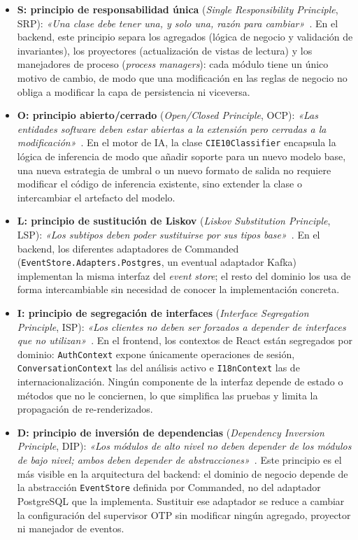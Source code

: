 \begin{itemize}
 \item \textbf{S: principio de responsabilidad única} (\emph{Single Responsibility Principle}, SRP): \emph{«Una clase debe tener una, y solo una, razón para cambiar»}~\cite{MartinPPP02}. En el backend, este principio separa los agregados (lógica de negocio y validación de invariantes), los proyectores (actualización de vistas de lectura) y los manejadores de proceso (\emph{process managers}): cada módulo tiene un único motivo de cambio, de modo que una modificación en las reglas de negocio no obliga a modificar la capa de persistencia ni viceversa.

 \item \textbf{O: principio abierto/cerrado} (\emph{Open/Closed Principle}, OCP): \emph{«Las entidades software deben estar abiertas a la extensión pero cerradas a la modificación»}~\cite{MartinPPP02}. En el motor de IA, la clase \texttt{CIE10Classifier} encapsula la lógica de inferencia de modo que añadir soporte para un nuevo modelo base, una nueva estrategia de umbral o un nuevo formato de salida no requiere modificar el código de inferencia existente, sino extender la clase o intercambiar el artefacto del modelo.

 \item \textbf{L: principio de sustitución de Liskov} (\emph{Liskov Substitution Principle}, LSP): \emph{«Los subtipos deben poder sustituirse por sus tipos base»}~\cite{Liskov87,MartinPPP02}. En el backend, los diferentes adaptadores de Commanded (\texttt{EventStore.Adapters.Postgres}, un eventual adaptador Kafka) implementan la misma interfaz del \emph{event store}; el resto del dominio los usa de forma intercambiable sin necesidad de conocer la implementación concreta.

 \item \textbf{I: principio de segregación de interfaces} (\emph{Interface Segregation Principle}, ISP): \emph{«Los clientes no deben ser forzados a depender de interfaces que no utilizan»}~\cite{MartinPPP02}. En el frontend, los contextos de React están segregados por dominio: \texttt{AuthContext} expone únicamente operaciones de sesión, \texttt{ConversationContext} las del análisis activo e \texttt{I18nContext} las de internacionalización. Ningún componente de la interfaz depende de estado o métodos que no le conciernen, lo que simplifica las pruebas y limita la propagación de re-renderizados.

 \item \textbf{D: principio de inversión de dependencias} (\emph{Dependency Inversion Principle}, DIP): \emph{«Los módulos de alto nivel no deben depender de los módulos de bajo nivel; ambos deben depender de abstracciones»}~\cite{MartinPPP02}. Este principio es el más visible en la arquitectura del backend: el dominio de negocio depende de la abstracción \texttt{EventStore} definida por Commanded, no del adaptador PostgreSQL que la implementa. Sustituir ese adaptador se reduce a cambiar la configuración del supervisor OTP sin modificar ningún agregado, proyector ni manejador de eventos.
\end{itemize}

